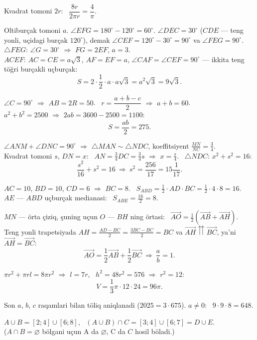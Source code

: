 Kvadrat tomoni $2r$: \ $\dfrac{8r}{2\pi r}=\dfrac4\pi$.

Oltiburçak tomoni $a$. $\angle EFG=180^\circ-120^\circ=60^\circ$. $\angle DEC=30^\circ$ ($CDE$ — teng yonli, uçidagi burçak $120^\circ$), demak $\angle CEF=120^\circ-30^\circ=90^\circ$ va $\angle FEG=90^\circ$.\\
$\triangle FEG$: $\angle G=30^\circ$ $\Rightarrow$ $FG=2EF$, $a=3$.\\
$ACEF$: $AC=CE=a\sqrt3$, $AF=EF=a$, $\angle CAF=\angle CEF=90^\circ$ — ikkita teng töğri burçakli uçburçak:
\[S=2\cdot\frac12\cdot a\cdot a\sqrt3=a^2\sqrt3=9\sqrt3.\]

$\angle C=90^\circ$ $\Rightarrow$ $AB=2R=50$. \ $r=\dfrac{a+b-c}2$ $\Rightarrow$ $a+b=60$.\\
$a^2+b^2=2500$ $\Rightarrow$ $2ab=3600-2500=1100$:
\[S=\frac{ab}2=275.\]

$\angle ANM+\angle DNC=90^\circ$ $\Rightarrow$ $\triangle MAN\sim\triangle NDC$, koeffitsiyent $\frac{MN}{NC}=\frac34$.\\
Kvadrat tomoni $s$, $DN=x$: \ $AN=\frac34DC=\frac34s$ $\Rightarrow$ $x=\frac s4$. \ $\triangle NDC$: $x^2+s^2=16$:
\[\frac{s^2}{16}+s^2=16\ \Rightarrow\ s^2=\frac{256}{17}=15\frac1{17}.\]

$AC=10$, $BD=10$, $CD=6$ $\Rightarrow$ $BC=8$. \ $S_{ABD}=\frac12\cdot AD\cdot BC=\frac12\cdot4\cdot8=16$.\\
$AE$ — $ABD$ uçburçak medianasi: \ $S_{ABE}=\frac{16}2=8$.

$MN$ — örta çiziq, şuning uçun $O$ — $BH$ ning örtasi: \ $\overrightarrow{AO}=\frac12\left(\overrightarrow{AB}+\overrightarrow{AH}\right)$.\\
Teng yonli trapetsiyada $AH=\frac{AD-BC}2=\frac{3BC-BC}2=BC$ va $\overrightarrow{AH}\upuparrows\overrightarrow{BC}$, ya'ni $\overrightarrow{AH}=\overrightarrow{BC}$:
\[\overrightarrow{AO}=\frac12\overrightarrow{AB}+\frac12\overrightarrow{BC}\ \Rightarrow\ \frac ab=1.\]

$\pi r^2+\pi rl=8\pi r^2$ $\Rightarrow$ $l=7r$, \ $h^2=48r^2=576$ $\Rightarrow$ $r^2=12$:
\[V=\frac13\pi\cdot12\cdot24=96\pi.\]

Son $a$, $b$, $c$ raqamlari bilan töliq aniqlanadi ($2025=3\cdot675$). $a\ne0$: \ $9\cdot9\cdot8=648$.

$A\cup B=[2;4]\cup[6;8]$, \ $(A\cup B)\cap C=[3;4]\cup[6;7]=D\cup E$.\\
($A\cap B=\varnothing$ bölgani uçun A da $\varnothing$, C da $C$ hosil böladi.)

